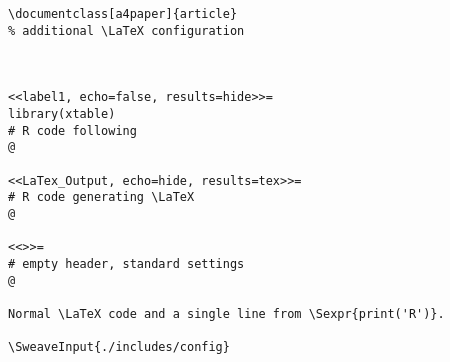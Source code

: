 \begin{lstlisting}
\documentclass[a4paper]{article}
% additional \LaTeX configuration



<<label1, echo=false, results=hide>>=
library(xtable)
# R code following
@

<<LaTex_Output, echo=hide, results=tex>>=
# R code generating \LaTeX
@

<<>>=
# empty header, standard settings
@

Normal \LaTeX code and a single line from \Sexpr{print('R')}.

\SweaveInput{./includes/config}



\end{lstlisting} 
